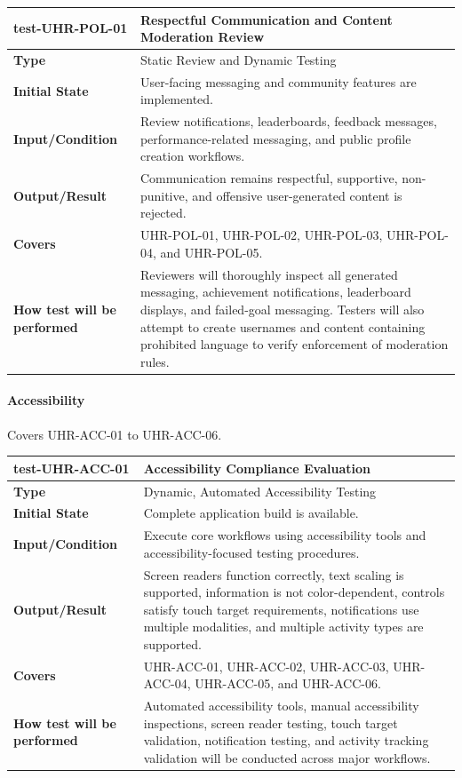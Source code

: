 \documentclass[12pt, titlepage]{article}
\begin{document}
\vspace{1em}

\noindent\begin{tabularx}{\textwidth}{>{\raggedright\arraybackslash}p{3.5cm}X}
  \toprule
  \textbf{test-UHR-POL-01} & \textbf{Respectful Communication and Content Moderation Review}\\
  \midrule
  \textbf{Type} & Static Review and Dynamic Testing\\
  \textbf{Initial State} & User-facing messaging and community features are implemented.\\
  \textbf{Input/Condition} & Review notifications, leaderboards, feedback messages, performance-related messaging, and public profile creation workflows.\\
  \textbf{Output/Result} & Communication remains respectful, supportive, non-punitive, and offensive user-generated content is rejected.\\
  \textbf{Covers} & UHR-POL-01, UHR-POL-02, UHR-POL-03, UHR-POL-04, and UHR-POL-05.\\
  \textbf{How test will be performed} & Reviewers will thoroughly inspect all generated messaging, achievement notifications, leaderboard displays, and failed-goal messaging. Testers will also attempt to create usernames and content containing prohibited language to verify enforcement of moderation rules.\\
  \bottomrule
\end{tabularx}

\paragraph{Accessibility}

Covers UHR-ACC-01 to UHR-ACC-06.

\noindent\begin{tabularx}{\textwidth}{>{\raggedright\arraybackslash}p{3.5cm}X}
  \toprule
  \textbf{test-UHR-ACC-01} & \textbf{Accessibility Compliance Evaluation}\\
  \midrule
  \textbf{Type} & Dynamic, Automated Accessibility Testing\\
  \textbf{Initial State} & Complete application build is available.\\
  \textbf{Input/Condition} & Execute core workflows using accessibility tools and accessibility-focused testing procedures.\\
  \textbf{Output/Result} & Screen readers function correctly, text scaling is supported, information is not color-dependent, controls satisfy touch target requirements, notifications use multiple modalities, and multiple activity types are supported.\\
  \textbf{Covers} & UHR-ACC-01, UHR-ACC-02, UHR-ACC-03, UHR-ACC-04, UHR-ACC-05, and UHR-ACC-06.\\
  \textbf{How test will be performed} & Automated accessibility tools, manual accessibility inspections, screen reader testing, touch target validation, notification testing, and activity tracking validation will be conducted across major workflows.\\
  \bottomrule
\end{tabularx}
\end{document}
